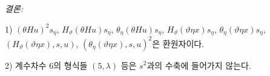 
\noindent\emph{결론:}

1) $(\theta Hu)^2s_\eta$, $H_\vartheta(\theta Hu)s_\eta$, $\theta_\eta(\theta Hu)s_\eta$, $H_\vartheta(\vartheta\eta x)s_\eta$, $\theta_\eta(\vartheta\eta x)s_\eta$, $(H_\vartheta(\vartheta\eta x),s,u)$, $(\theta_\eta(\vartheta\eta x),s,u)^2$은 환원자이다.

2) 계수차수 6의 형식들 $(5,\lambda)$ 등은 $s^2$과의 수축에 들어가지 않는다.
